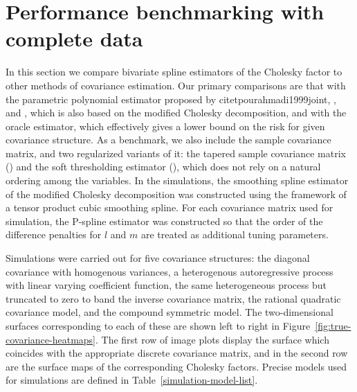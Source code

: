 \section{Performance benchmarking with complete data}

In this section we compare bivariate spline estimators of the Cholesky factor to other methods of covariance estimation. Our primary comparisons are that with the parametric polynomial estimator proposed by citet{pourahmadi1999joint},  \cite{pan2003modelling}, and \cite{pourahmadi2002dynamic}, which is also based on the modified Cholesky decomposition, and with the oracle estimator, which effectively gives a lower bound on the risk for given covariance structure. As a benchmark, we also include the sample covariance matrix, and two regularized variants of it: the tapered sample covariance matrix (\cite{cai2010optimal}) and the soft thresholding estimator (\cite{rothman2009generalized}), which does not rely on a natural ordering among the variables. In the simulations, the smoothing spline estimator of the modified Cholesky decomposition was constructed using the framework of a tensor product cubic smoothing spline. For each covariance matrix used for simulation, the P-spline estimator was constructed so that the order of the difference penalties for $l$ and $m$ are treated as additional tuning parameters.

\bigskip

Simulations were carried out for five covariance structures: the diagonal covariance with homogenous variances, a heterogenous autoregressive process with linear varying coefficient function, the same heterogeneous process but truncated to zero to band the inverse covariance matrix, the rational quadratic covariance model, and the compound symmetric model. The two-dimensional surfaces corresponding to each of these are shown left to right in Figure~\ref{fig:true-covariance-heatmaps}. The first row of image plots display the surface which coincides with the appropriate discrete covariance matrix, and in the second row are the surface maps of the corresponding Cholesky factors. Precise models used for simulations are defined in Table~\ref{simulation-model-list}.

\bigskip


